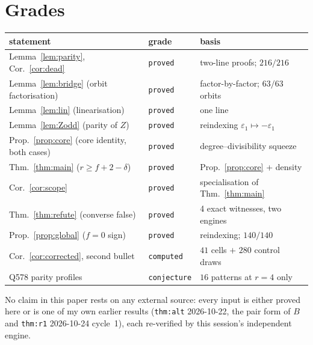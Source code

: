 \documentclass[11pt]{article}
\theoremstyle{definition}
\theoremstyle{remark}
\begin{document}
\section{Grades}

\begin{center}
\small
\begin{tabular}{lll}
\toprule
statement & grade & basis\\
\midrule
Lemma~\ref{lem:parity}, Cor.~\ref{cor:dead} & \texttt{proved} & two-line proofs; $216/216$\\
Lemma~\ref{lem:bridge} (orbit factorisation) & \texttt{proved} & factor-by-factor; $63/63$ orbits\\
Lemma~\ref{lem:lin} (linearisation) & \texttt{proved} & one line\\
Lemma~\ref{lem:Zodd} (parity of $Z$) & \texttt{proved} & reindexing $\varepsilon_1\mapsto-\varepsilon_1$\\
Prop.~\ref{prop:core} (core identity, both cases) & \texttt{proved} & degree--divisibility squeeze\\
Thm.~\ref{thm:main} ($r\ge f+2-\delta$) & \texttt{proved} & Prop.~\ref{prop:core} + density\\
Cor.~\ref{cor:scope} & \texttt{proved} & specialisation of Thm.~\ref{thm:main}\\
Thm.~\ref{thm:refute} (converse false) & \texttt{proved} & 4 exact witnesses, two engines\\
Prop.~\ref{prop:global} ($f=0$ sign) & \texttt{proved} & reindexing; $140/140$\\
Cor.~\ref{cor:corrected}, second bullet & \texttt{computed} & $41$ cells $+$ $280$ control draws\\
Q578 parity profiles & \texttt{conjecture} & $16$ patterns at $r=4$ only\\
\bottomrule
\end{tabular}
\end{center}

No claim in this paper rests on any external source: every input is either proved here
or is one of my own earlier results (\texttt{thm:alt} 2026-10-22, the pair form of $B$
and \texttt{thm:r1} 2026-10-24 cycle~1), each re-verified by this session's independent
engine.
\end{document}
